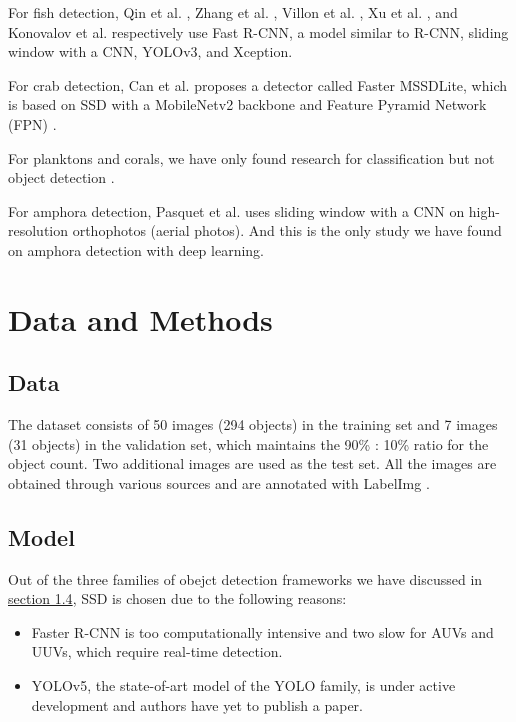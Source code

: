 \documentclass[a4paper,11pt,oneside]{article}
\begin{document}
  For fish detection, Qin et al. \cite{qin2015underwater, li2015fast}, Zhang et al. \cite{zhang2016unsupervised},
  Villon et al. \cite{villon2016coral}, Xu et al. \cite{xu2018underwater}, and Konovalov et al.
  \cite{konovalov2019underwater} respectively use Fast R-CNN, a model similar to R-CNN, sliding window with a CNN,
  YOLOv3, and Xception.

  For crab detection, Can et al. \cite{cao2020real} proposes a detector called Faster MSSDLite, which is based on SSD with
  a MobileNetv2 backbone and Feature Pyramid Network (FPN) \cite{lin2017feature}.

  For planktons and corals, we have only found research for classification but not object detection
  \cite{qin2015underwater, moniruzzaman2017deep}.

  For amphora detection, Pasquet et al. \cite{mccarthy20193d, pasquet2017amphora} uses sliding window with a CNN on
  high-resolution orthophotos (aerial photos). And this is the only study we have found on amphora detection with deep
  learning.

  \section{Data and Methods}

  \subsection{Data}

  The dataset consists of 50 images (294 objects) in the training set and 7 images (31 objects) in the validation set,
  which maintains the 90\% : 10\% ratio for the object count. Two additional images are used as the test set. All the
  images are obtained through various sources \cite{googleimages, groplan, phoenician} and are annotated with LabelImg
  \cite{labelimg}.

  \subsection{Model}

  Out of the three families of obejct detection frameworks we have discussed in \hyperref[sec:14]{section 1.4}, SSD is
  chosen due to the following reasons:

  \begin{itemize}
    \item Faster R-CNN is too computationally intensive and two slow for AUVs and UUVs, which require real-time detection.
    \item YOLOv5, the state-of-art model of the YOLO family, is under active development and authors have yet to publish
    a paper.
  \end{itemize}
\end{document}
